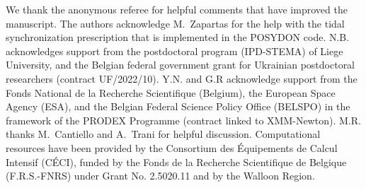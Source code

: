 \documentclass{aa}
\begin{document}
\begin{acknowledgements}
We thank the anonymous referee for helpful comments that
have improved the manuscript. The authors acknowledge M.~Zapartas for the help with the tidal synchronization prescription that is implemented in the POSYDON code.
N.B. acknowledges support from the postdoctoral program (IPD-STEMA) of
Liege University, and the Belgian federal government grant for Ukrainian
postdoctoral researchers (contract UF/2022/10). Y.N. and G.R acknowledge support from the Fonds
National de la Recherche Scientifique (Belgium), the European Space
Agency (ESA), and the Belgian Federal Science Policy Office (BELSPO)
in the framework of the PRODEX Programme (contract linked to
XMM-Newton). M.R. thanks M.~Cantiello and A.~Trani for helpful discussion.
Computational resources have been provided by the Consortium des Équipements de Calcul Intensif (CÉCI), funded by the Fonds de la Recherche Scientifique de Belgique (F.R.S.-FNRS) under Grant No. 2.5020.11 and by the Walloon Region.
\end{acknowledgements}




\end{document}
